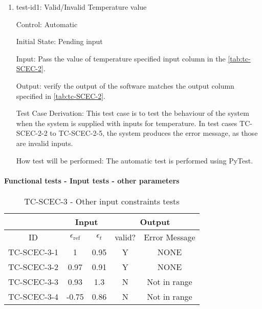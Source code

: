 \documentclass[12pt, titlepage]{article}
\begin{document}
\begin{enumerate}   

\item{test-id1: Valid/Invalid Temperature value  \\}

Control: Automatic
					
Initial State: Pending input 
					
Input: Pass the value of temperature specified input column in the \autoref{tab:tc-SCEC-2}.
					
Output: verify the output of the software matches the output column specified in \autoref{tab:tc-SCEC-2}. 

Test Case Derivation: This test case is to test the behaviour of the system when the system is supplied with inputs for temperature. In test cases TC-SCEC-2-2 to TC-SCEC-2-5, the system produces the error message, as those are invalid inputs. 
					
How test will be performed: The automatic test is performed using PyTest.  


					

\end{enumerate}

\paragraph{Functional tests - Input tests - other parameters}


\begin{table}[h!]
\begin{center}
\begin{tabular}{ lcccc }
\hline
\multicolumn{1}{l|}{}   & \multicolumn{2}{c|}{Input}                            & \multicolumn{2}{c}{Output} \\ 

\hline

\multicolumn{1}{c|}{ID}  &   $\epsilon_\text{ref}$  &   \multicolumn{1}{c|}{$\epsilon_t$}   &   {valid?}   &   Error Message    \\ \hline

TC-SCEC-3-1   &   1      & 0.95   & Y   & NONE          \\
TC-SCEC-3-2   &   0.97   & 0.91   & Y   & NONE          \\
TC-SCEC-3-3   &   0.93   & 1.3    & N   & Not in range  \\
TC-SCEC-3-4   &   -0.75  & 0.86   & N   & Not in range  \\ 

\hline


\end{tabular}
\caption{TC-SCEC-3 - Other input constraints tests}
\label{tab:tc-SCEC-3}
\end{center}
\end{table}
\end{document}
